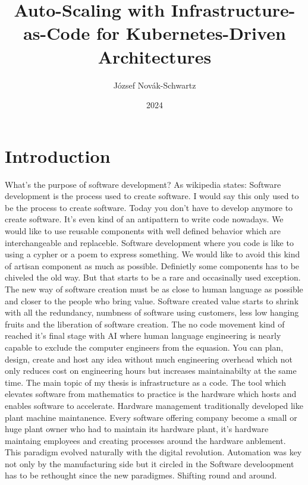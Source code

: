 \documentclass[
]{elteikthesis}[2024/04/10]
\title{Auto-Scaling with Infrastructure-as-Code for Kubernetes-Driven Architectures} %
\date{2024} %
\author{József Novák-Schwartz}
\affiliation{Associate Professor} %
\begin{document}


\maketitle


\tableofcontents
\cleardoublepage

\chapter{Introduction}
\label{ch:intro}

What's the purpose of software development? 
As wikipedia states: Software development is the process used to create software. I would say this only used to be the process to create software. Today you don't have to develop anymore to create software. It's even kind of an antipattern to write code nowadays. We would like  to use reusable components with well defined behavior which are interchangeable and replaceble. Software development where you code is like to using a cypher or a poem to express something. We would like to avoid this kind of artisan component as much as possible. Definietly some components has to be chiveled the old way. But that starts to be a rare and occasinally used exception. The new way of software creation must be as close to human language as possible and closer to the people who bring value. Software created value starts to shrink with all the redundancy, numbness of software using customers, less low hanging fruits and the liberation of software creation. The no code movement kind of reached it's final stage with AI where human language engineering is nearly capable to exclude the computer engineers from the equasion. You can plan, design, create and host any idea without much engineering overhead which not only reduces cost on engineering hours but increases maintainabilty at the same time.
The main topic of my thesis is infrastructure as a code. The tool which elevates software from mathematics to practice is the hardware which hosts and enables software to accelerate. Hardware management traditionally developed like plant machine maintanence. Every software offering company become a small or huge plant owner who had to maintain its hardware plant, it's hardware maintaing employees and creating processes around the hardware anblement. This paradigm evolved naturally with the digital revolution.
Automation was key not only by the manufacturing side but it circled in the 
Software develoopment has to be rethought since the new paradigmes. Shifting round and around.
\end{document}
